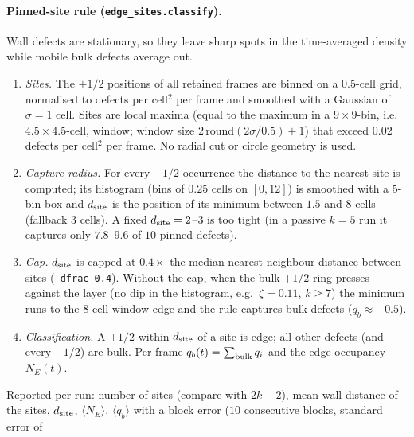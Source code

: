 \paragraph{Pinned-site rule (\texttt{edge\_sites.classify}).}
\label{sec:methods-sites}
Wall defects are stationary, so they leave sharp spots in the time-averaged density while mobile bulk
defects average out.
\begin{enumerate}
  \item \emph{Sites.} The $+1/2$ positions of all retained frames are binned on a $0.5$-cell grid,
        normalised to defects per cell$^2$ per frame and smoothed with a Gaussian of
        $\sigma=1$ cell. Sites are local maxima (equal to the maximum in a
        $9\times9$-bin, i.e.\ $4.5\times4.5$-cell, window; window size $2\,\mathrm{round}(2\sigma/0.5)+1$)
        that exceed $0.02$ defects per cell$^2$ per frame. No radial cut or circle geometry is used.
  \item \emph{Capture radius.} For every $+1/2$ occurrence the distance to the nearest site is computed;
        its histogram (bins of $0.25$ cells on $[0,12]$) is smoothed with a $5$-bin box and
        $d_{\rm site}$ is the position of its minimum between $1.5$ and $8$ cells (fallback $3$ cells).
        A fixed $d_{\rm site}=2$--$3$ is too tight (in a passive $k=5$ run it captures only $7.8$--$9.6$
        of $10$ pinned defects).
  \item \emph{Cap.} $d_{\rm site}$ is capped at $0.4\times$ the median nearest-neighbour distance
        between sites (\texttt{--dfrac 0.4}). Without the cap, when the bulk $+1/2$ ring presses against
        the layer (no dip in the histogram, e.g.\ $\zeta=0.11$, $k\ge7$) the minimum runs to the $8$-cell
        window edge and the rule captures bulk defects ($q_b\approx-0.5$).
  \item \emph{Classification.} A $+1/2$ within $d_{\rm site}$ of a site is edge; all other defects
        (and every $-1/2$) are bulk. Per frame $q_b(t)=\sum_{\rm bulk}q_i$ and the edge occupancy $N_E(t)$.
\end{enumerate}
Reported per run: number of sites (compare with $2k-2$), mean wall distance of the sites, $d_{\rm site}$,
$\langle N_E\rangle$, $\langle q_b\rangle$ with a block error ($10$ consecutive blocks, standard error of
